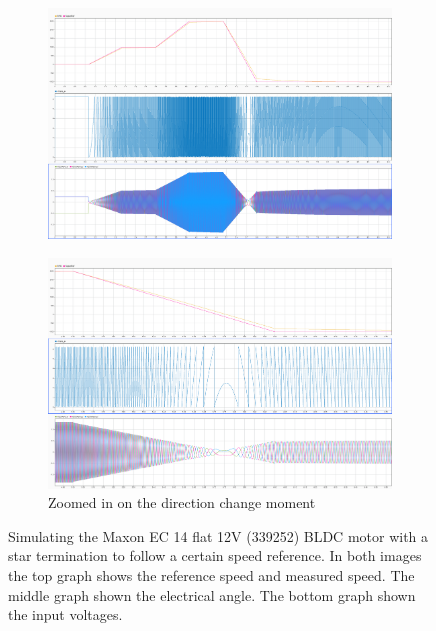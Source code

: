 \documentclass[]{report}
\begin{document}
\begin{figure}[H]
	\centering
	\begin{subfigure}{\textwidth}
		\centering
		\includegraphics[width=\textwidth]{Matlab/SpeedRefFollowStar.png}
		\caption{}
		\label{fig:SpeedRefFollowMaxon}
	\end{subfigure}
	\hfill
	\begin{subfigure}{\textwidth}
		\centering
		\includegraphics[width=\textwidth]{Matlab/SpeedRefFollowStar_ZoomedDirectionChange.png}
		\caption{Zoomed in on the direction change moment}
		\label{fig:SpeedRefFollowMaxonDirectionChangeZoom}
	\end{subfigure}
	\caption{Simulating the Maxon EC 14 flat 12V (339252) BLDC motor \cite{Maxon_motor_EC_14} with a star termination to follow a certain speed reference. In both images the top graph shows the reference speed and measured speed. The middle graph shown the electrical angle. The bottom graph shown the input voltages.}
	\label{fig:DQ_SpeedRefStarMotor}
\end{figure}
\end{document}
